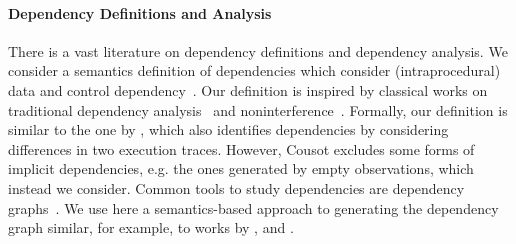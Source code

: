 


\paragraph{Dependency Definitions and Analysis} 
There is a vast literature on dependency definitions and dependency analysis. 
We consider a semantics definition of dependencies which consider (intraprocedural) data and control dependency~\cite{bilardi1996framework,cytron1991efficiently,pollock1989incremental}.    
Our definition is inspired by classical works on traditional dependency analysis~\cite{DenningD77} and noninterference~\cite{GoguenM82a}.
Formally, our definition is similar to the one by \citet{Cousot19a}, which also identifies dependencies by considering differences in two execution traces. 
However, Cousot excludes some forms of implicit dependencies, e.g. the ones generated by empty observations,  which instead we consider. 
%
Common tools to study dependencies are dependency graphs~\cite{ferrante1987program}. We use here a semantics-based approach to generating the dependency graph similar, for example, to works by \citet{austin1992dynamic}, \citet{hammer2006dynamic} and \cite{mastroeni2008data}.
